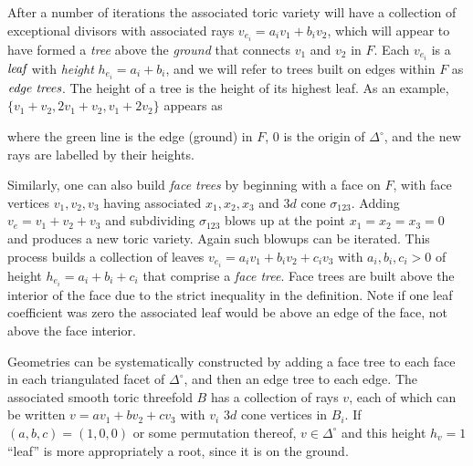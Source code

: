 \documentclass[aps,prl,twocolumn, superscriptaddress,groupedaddress,nofootinbib]{revtex4}
\begin{document}
After a number of iterations the associated toric variety will have
a collection of exceptional divisors with associated rays
$v_{e_i}=a_i v_1 + b_i v_2$, which will appear to have formed
a \emph{tree} above the \emph{ground} that connects $v_1$ and
$v_2$ in $F$. Each $v_{e_i}$ is a $\emph{leaf}$ with
\emph{height} $h_{e_i}=a_i+b_i$, and 
we will refer to trees built on edges within $F$ as
$\emph{edge trees}$. The height of a tree is the height of
its highest leaf. As an example,
$\{v_1+v_2,2v_1+v_2,v_1+2v_2\}$ appears as
\begin{center}
\end{center}
where the green line is the edge (ground)
in $F$, $0$ is the origin of $\Delta^\circ$, and
the new rays are labelled by their heights.

Similarly, one can also build \emph{face trees} by beginning
with a face on $F$, with face vertices
$v_1, v_2, v_3$ having associated $x_1, x_2, x_3$ and $3d$
cone $\sigma_{123}$. Adding $v_e=v_1+v_2+v_3$ and subdividing
$\sigma_{123}$ blows up at the point $x_1=x_2=x_3=0$  and produces a new toric variety. Again such
blowups can be iterated. This process builds a collection of
leaves
$v_{e_i}=a_i v_1 + b_i v_2 + c_i v_3$ with $a_i,b_i,c_i > 0$ of
height $h_{e_i}=a_i+b_i+c_i$ that comprise
a \emph{face tree}. Face trees are built above the interior of the face
due to the strict inequality in the definition. Note
if one leaf coefficient was zero the associated leaf would be above an edge
of the face, not above the face interior.

Geometries can be systematically constructed by adding a face tree to each face in each triangulated facet of $\Delta^\circ$, and then an edge tree to each edge. The associated smooth toric
threefold $B$ has a collection of rays $v$, each of which can be written $v=av_1+bv_2+cv_3$ with $v_i$ $3d$ cone vertices in $B_i$. If $(a,b,c)=(1,0,0)$ or some
permutation thereof, $v\in \Delta^\circ$ and this height $h_v=1$ ``leaf'' is more
appropriately a root, since it is on the ground.
\end{document}
